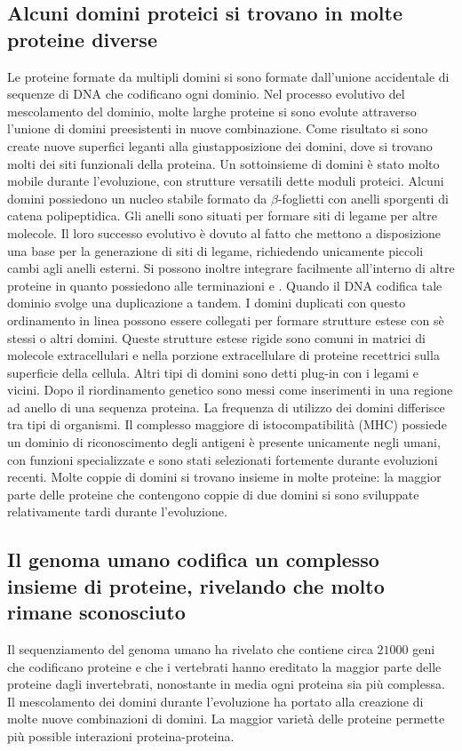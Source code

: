 \subsection{Alcuni domini proteici si trovano in molte proteine diverse}
Le proteine formate da multipli domini si sono formate dall'unione accidentale di sequenze di DNA che codificano ogni dominio. Nel processo evolutivo del mescolamento del dominio, 
molte larghe proteine si sono evolute attraverso l'unione di domini preesistenti in nuove combinazione. Come risultato si sono create nuove superfici leganti alla giustapposizione dei
domini, dove si trovano molti dei siti funzionali della proteina. Un sottoinsieme di domini \`e stato molto mobile durante l'evoluzione, con strutture versatili dette moduli proteici. 
Alcuni domini possiedono un nucleo stabile formato da $\beta$-foglietti con anelli sporgenti di catena polipeptidica. Gli anelli sono situati per formare siti di legame per altre 
molecole. Il loro successo evolutivo \`e dovuto al fatto che mettono a disposizione una base per la generazione di siti di legame, richiedendo unicamente piccoli cambi agli anelli 
esterni. Si possono inoltre integrare facilmente all'interno di altre proteine in quanto possiedono alle terminazioni  e . Quando il DNA codifica tale dominio svolge una
duplicazione a tandem. I domini duplicati con questo ordinamento in linea possono essere collegati per formare strutture estese con s\`e stessi o altri domini. Queste strutture estese
rigide sono comuni in matrici di molecole extracellulari e nella porzione extracellulare di proteine recettrici sulla superficie della cellula. Altri tipi di domini sono detti plug-in
con i legami  e  vicini. Dopo il riordinamento genetico sono messi come inserimenti in una regione ad anello di una sequenza proteina. La frequenza di utilizzo dei domini
differisce tra tipi di organismi. Il complesso maggiore di istocompatibilit\`a (MHC) possiede un dominio di riconoscimento degli antigeni \`e presente unicamente negli umani, con 
funzioni specializzate e sono stati selezionati fortemente durante evoluzioni recenti. Molte coppie di domini si trovano insieme in molte proteine: la maggior parte delle proteine che
contengono coppie di due domini si sono sviluppate relativamente tardi durante l'evoluzione.
\subsection{Il genoma umano codifica un complesso insieme di proteine, rivelando che molto rimane sconosciuto}
Il sequenziamento del genoma umano ha rivelato che contiene circa $21000$ geni che codificano proteine e che i vertebrati hanno ereditato la maggior parte delle proteine dagli 
invertebrati, nonostante in media ogni proteina sia pi\`u complessa. Il mescolamento dei domini durante l'evoluzione ha portato alla creazione di molte nuove combinazioni di domini. La
maggior variet\`a delle proteine permette pi\`u possible interazioni proteina-proteina.

